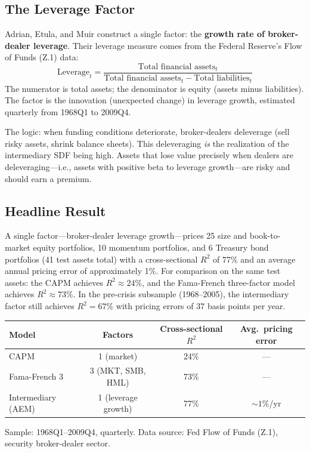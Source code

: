 \subsection{The Leverage Factor}

Adrian, Etula, and Muir construct a single factor: the \textbf{growth rate of broker-dealer leverage}. Their leverage measure comes from the Federal Reserve's Flow of Funds (Z.1) data:
\begin{equation}
\text{Leverage}_t = \frac{\text{Total financial assets}_t}{\text{Total financial assets}_t - \text{Total liabilities}_t}
\label{eq:aem-leverage}
\end{equation}
The numerator is total assets; the denominator is equity (assets minus liabilities). The factor is the innovation (unexpected change) in leverage growth, estimated quarterly from 1968Q1 to 2009Q4.

The logic: when funding conditions deteriorate, broker-dealers deleverage (sell risky assets, shrink balance sheets). This deleveraging \emph{is} the realization of the intermediary SDF being high. Assets that lose value precisely when dealers are deleveraging---i.e., assets with positive beta to leverage growth---are risky and should earn a premium.

\subsection{Headline Result}

\begin{keyresult}
A single factor---broker-dealer leverage growth---prices 25 size and book-to-market equity portfolios, 10 momentum portfolios, and 6 Treasury bond portfolios (41 test assets total) with a cross-sectional $R^2$ of 77\% and an average annual pricing error of approximately 1\%. For comparison on the same test assets: the CAPM achieves $R^2 \approx 24\%$, and the Fama-French three-factor model achieves $R^2 \approx 73\%$. In the pre-crisis subsample (1968--2005), the intermediary factor still achieves $R^2 = 67\%$ with pricing errors of 37 basis points per year.
\begin{center}
\begin{tabular}{lccc}
\toprule
\textbf{Model} & \textbf{Factors} & \textbf{Cross-sectional $R^2$} & \textbf{Avg.\ pricing error} \\
\midrule
CAPM               & 1 (market) & 24\% & --- \\
Fama-French 3      & 3 (MKT, SMB, HML) & 73\% & --- \\
Intermediary (AEM) & 1 (leverage growth) & 77\% & ${\sim}1\%$/yr \\
\bottomrule
\end{tabular}
\end{center}
Sample: 1968Q1--2009Q4, quarterly. Data source: Fed Flow of Funds (Z.1), security broker-dealer sector.
\end{keyresult}

